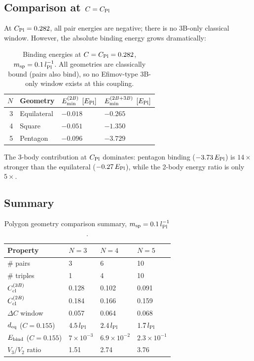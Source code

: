 \subsection{Comparison at \texorpdfstring{$C=C_{\rm Pl}$}{C=C\_Pl}}

At $C_{\rm Pl}=0.282$, all pair energies are negative; there is no
3B-only classical window.  However, the absolute binding energy grows
dramatically:

\begin{table}[h]
\centering
\caption{Binding energies at $C=C_{\rm Pl}=0.282$,
$m_{\rm sp}=0.1\,l_{\rm Pl}^{-1}$.  All geometries are classically bound
(pairs also bind), so no Efimov-type 3B-only window exists at this coupling.}
\label{tab:polygon_cpl}
\begin{tabular}{rlll}
\hline
$N$ & Geometry & $E_{\rm min}^{(2B)}$ $[E_{\rm Pl}]$ &
$E_{\rm min}^{(2B+3B)}$ $[E_{\rm Pl}]$ \\
\hline
3 & Equilateral & $-0.018$ & $-0.265$ \\
4 & Square      & $-0.051$ & $-1.350$ \\
5 & Pentagon    & $-0.096$ & $-3.729$ \\
\hline
\end{tabular}
\end{table}

The 3-body contribution at $C_{\rm Pl}$ dominates: pentagon binding
($-3.73\,E_{\rm Pl}$) is $14\times$ stronger than the equilateral
($-0.27\,E_{\rm Pl}$), while the 2-body energy ratio is only $5\times$.

\subsection{Summary}

\begin{table}[h]
\centering
\caption{Polygon geometry comparison summary, $m_{\rm sp}=0.1\,l_{\rm Pl}^{-1}$.}
\label{tab:polygon_summary}
\begin{tabular}{llll}
\hline
Property & $N=3$ & $N=4$ & $N=5$ \\
\hline
\# pairs                   & 3    & 6    & 10 \\
\# triples                 & 1    & 4    & 10 \\
$C_{\rm cl}^{(3B)}$        & 0.128 & 0.102 & 0.091 \\
$C_{\rm cl}^{(2B)}$        & 0.184 & 0.166 & 0.159 \\
$\Delta C$ window          & 0.057 & 0.064 & 0.068 \\
$d_{\rm eq}$ ($C=0.155$)   & $4.5\,l_{\rm Pl}$ & $2.4\,l_{\rm Pl}$ & $1.7\,l_{\rm Pl}$ \\
$E_{\rm bind}$ ($C=0.155$) & $7\times10^{-3}$ & $6.9\times10^{-2}$ & $2.3\times10^{-1}$ \\
$V_3/V_2$ ratio            & 1.51 & 2.74 & 3.76 \\
\hline
\end{tabular}
\end{table}

